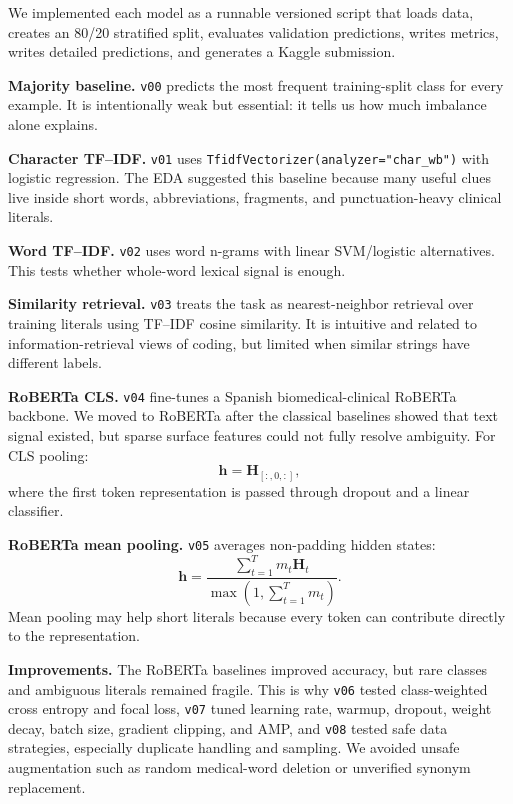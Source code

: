 \documentclass[10pt,a4paper,twocolumn]{article}
\begin{document}
We implemented each model as a runnable versioned script that loads data, creates an 80/20 stratified split, evaluates validation predictions, writes metrics, writes detailed predictions, and generates a Kaggle submission.

\textbf{Majority baseline.} \texttt{v00} predicts the most frequent training-split class for every example. It is intentionally weak but essential: it tells us how much imbalance alone explains.

\textbf{Character TF--IDF.} \texttt{v01} uses \texttt{TfidfVectorizer(analyzer="char\_wb")} with logistic regression. The EDA suggested this baseline because many useful clues live inside short words, abbreviations, fragments, and punctuation-heavy clinical literals.

\textbf{Word TF--IDF.} \texttt{v02} uses word n-grams with linear SVM/logistic alternatives. This tests whether whole-word lexical signal is enough.

\textbf{Similarity retrieval.} \texttt{v03} treats the task as nearest-neighbor retrieval over training literals using TF--IDF cosine similarity. It is intuitive and related to information-retrieval views of coding, but limited when similar strings have different labels.

\textbf{RoBERTa CLS.} \texttt{v04} fine-tunes a Spanish biomedical-clinical RoBERTa backbone. We moved to RoBERTa after the classical baselines showed that text signal existed, but sparse surface features could not fully resolve ambiguity. For CLS pooling:
\begin{equation}
\mathbf{h} = \mathbf{H}_{[:,0,:]},
\end{equation}
where the first token representation is passed through dropout and a linear classifier.

\textbf{RoBERTa mean pooling.} \texttt{v05} averages non-padding hidden states:
\begin{equation}
\mathbf{h}
= \frac{\sum_{t=1}^{T} m_t \mathbf{H}_t}{\max(1,\sum_{t=1}^{T} m_t)}.
\end{equation}
Mean pooling may help short literals because every token can contribute directly to the representation.

\textbf{Improvements.} The RoBERTa baselines improved accuracy, but rare classes and ambiguous literals remained fragile. This is why \texttt{v06} tested class-weighted cross entropy and focal loss, \texttt{v07} tuned learning rate, warmup, dropout, weight decay, batch size, gradient clipping, and AMP, and \texttt{v08} tested safe data strategies, especially duplicate handling and sampling. We avoided unsafe augmentation such as random medical-word deletion or unverified synonym replacement.
\end{document}
